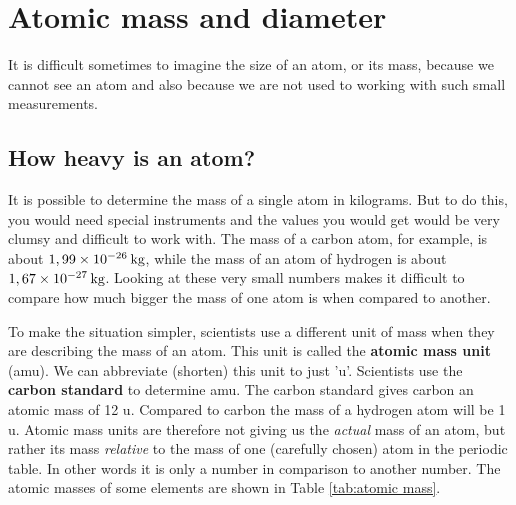             \section{Atomic mass and diameter}
            \nopagebreak
            \label{m38756*id254850}It is difficult sometimes to imagine the size of an atom, or its mass, because we cannot see an atom and also because we are not used to working with such small measurements.\par 
      \label{m38756*uid7}
            \subsection*{How heavy is an atom?}
            \nopagebreak
        \label{m38756*id254863}It is possible to determine the mass of a single atom in kilograms. But to do this, you would need special instruments and the values you would get would be very clumsy and difficult to work with. The mass of a carbon atom, for example, is about $1,99\ensuremath{\times}{10}^{-26}\phantom{\rule{2pt}{0ex}}\text{kg}$, while the mass of an atom of hydrogen is about $1,67\ensuremath{\times}{10}^{-27}\phantom{\rule{2pt}{0ex}}\text{kg}$. Looking at these very small numbers makes it difficult to compare how much bigger the mass of one atom is when compared to another.\par 
        \label{m38756*id254908}To make the situation simpler, scientists use a different unit of mass when they are describing the mass of an atom. This unit is called the \textbf{atomic mass unit} (amu). We can abbreviate (shorten) this unit to just 'u'. Scientists use the \textbf{carbon standard} to determine amu. The carbon standard gives carbon an atomic mass of 12 u. Compared to carbon the mass of a hydrogen atom will be 1 u. Atomic mass units are therefore not giving us the \textsl{actual} mass of an atom, but rather its mass \textsl{relative} to the mass of one (carefully chosen) atom in the periodic table. In other words it is only a number in comparison to another number. The atomic masses of some elements are shown in Table \ref{tab:atomic mass}.

